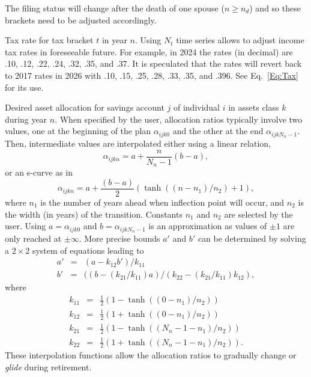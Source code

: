 \documentclass{article}[fleqn,12pt]
\begin{document}
\begin{description}[leftmargin=4em,style=multiline]
	The filing status will change after the death of one spouse ($n \ge n_d$) and so these
	brackets need to be adjusted accordingly.
\item [$\theta_{tn}$]
	Tax rate for tax bracket $t$ in year $n$. Using $N_t$ time series allows to adjust income
	tax rates in foreseeable future.
	For example, in 2024 the rates (in decimal) are .10, .12, .22, .24, .32, .35, and .37.
	It is speculated that the rates will revert back to 2017 rates in 2026 with
	.10, .15, .25, .28, .33, .35, and .396. See Eq.~\ref{Eq:Tax} for its use.
\item [$\alpha_{ijkn}$]
	Desired asset allocation for savings account $j$ of individual $i$ in assets class $k$ during year $n$.
	When specified by the user, allocation ratios typically involve two values, one at the
	beginning of the plan $\alpha_{ijk0}$ and the other at the end
	$\alpha_{ijkN_n-1}$. Then, intermediate values are interpolated either using
	a linear relation,
\begin{equation}
	\alpha_{ijkn} = a + \frac{n}{N_n - 1} (b - a),
\end{equation}
or an s-curve as in
\begin{equation}
	\alpha_{ijkn} = a + \frac{(b - a)}{2}
	(\tanh((n-n_1)/n_2) + 1),
\end{equation}
	where $n_1$ is the number of years ahead when inflection point will occur, and $n_2$ is the
	width (in years) of the transition. Constants $n_1$ and $n_2$ are selected by the user.
	Using $a = \alpha_{ijk0}$ and $b = \alpha_{ijkN_n-1}$ is an approximation as values of $\pm 1$
	are only reached at $\pm \infty$.
	More precise bounds $a'$ and $b'$ can be determined by solving a $2\times 2$ system
	of equations leading to
	\begin{eqnarray}
		a' &=& (a - k_{12}b')/k_{11} \nonumber \\
		b' &=& ((b - (k_{21}/k_{11})a)/(k_{22} - (k_{21}/k_{11})k_{12}),
	\end{eqnarray}
	where
	\begin{eqnarray}
		k_{11} &=& \frac{1}{2}(1 - \tanh((0-n_1)/n_2)) \nonumber \\
		k_{12} &=& \frac{1}{2}(1 + \tanh((0-n_1)/n_2)) \nonumber \\
		k_{21} &=& \frac{1}{2}(1 - \tanh((N_n-1-n_1)/n_2)) \nonumber \\
		k_{22} &=& \frac{1}{2}(1 + \tanh((N_n-1-n_1)/n_2)).
	\end{eqnarray}
	These interpolation functions allow the allocation ratios to gradually change
	or {\em glide} during retirement.


\end{description}
\end{document}
